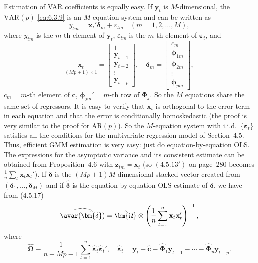 Estimation of VAR coefficients is equally easy. If $\mathbf{y}_t$ is $M$-dimensional, the $\text{VAR}(p)$
\eqref{eq:6.3.9} is an $M$-equation system and can be written as
\begin{equation}
  y_{tm} = \mathbf{x}_t' \bm{\delta}_m + \varepsilon_{tm} \quad (m = 1, 2, \ldots, M),
  \label{eq:6.4.9}
\end{equation}
where $y_{tm}$ is the $m$-th element of $\mathbf{y}_t$, $\varepsilon_{tm}$ is the $m$-th element of $\bm{\varepsilon}_t$, and
\[
  \underset{(Mp+1) \times 1}{\mathbf{x}_t} =
  \begin{bmatrix} 1 \\ \mathbf{y}_{t-1} \\ \mathbf{y}_{t-2} \\ \vdots \\ \mathbf{y}_{t-p} \end{bmatrix}, \quad
  \bm{\delta}_m =
  \begin{bmatrix} c_m \\ \bm{\phi}_{1m} \\ \bm{\phi}_{2m} \\ \vdots \\ \bm{\phi}_{pm} \end{bmatrix},
\]
$c_m = m$-th element of $\mathbf{c}$, $\bm{\phi}_{jm}' = m$-th row of $\bm{\Phi}_j$.
So the $M$ equations share the same set of regressors. It is easy to verify that $\mathbf{x}_t$
is orthogonal to the error term in each equation and that the error is conditionally
homoskedastic (the proof is very similar to the proof for $\text{AR}(p)$). So the
$M$-equation system with i.i.d.\ $\{\bm{\varepsilon}_t\}$ satisfies all the conditions for the multivariate
regression model of Section~4.5. Thus, efficient GMM estimation is very easy:
just do equation-by-equation OLS. The expressions for the asymptotic variance
and its consistent estimate can be obtained from Proposition~4.6 with $\mathbf{z}_{tm} = \mathbf{x}_t$ (so
$(4.5.13')$ on page~280 becomes $\frac{1}{n} \sum_t \mathbf{x}_t \mathbf{x}_t'$). If $\bm{\delta}$ is the $(Mp + 1)M$-dimensional
stacked vector created from $(\bm{\delta}_1, \ldots, \bm{\delta}_M)$ and if $\hat{\bm{\delta}}$ is the equation-by-equation OLS
estimate of $\bm{\delta}$, we have from (4.5.17)
\begin{equation}
  \widehat{\avar(\hat{\bm{\delta}})} = \hat{\bm{\Omega}} \otimes
  \left(\frac{1}{n} \sum_{t=1}^{n} \mathbf{x}_t \mathbf{x}_t'\right)^{-1},
  \label{eq:6.4.10}
\end{equation}
where
\begin{equation}
  \hat{\bm{\Omega}} \equiv \frac{1}{n - Mp - 1} \sum_{t=1}^{n} \hat{\bm{\varepsilon}}_t \hat{\bm{\varepsilon}}_t', \quad
  \hat{\bm{\varepsilon}}_t = \mathbf{y}_t - \hat{\mathbf{c}} - \hat{\bm{\Phi}}_1 \mathbf{y}_{t-1} - \cdots - \hat{\bm{\Phi}}_p \mathbf{y}_{t-p}.
  \label{eq:6.4.11}
\end{equation}

